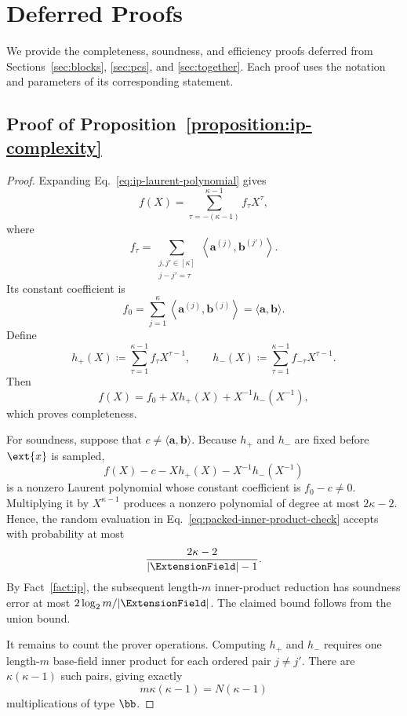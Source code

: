 \section{Deferred Proofs}
\label{appx:proof}
\label{appx:auxiliary-proofs}

We provide the completeness, soundness, and efficiency proofs
deferred from Sections~\ref{sec:blocks}, \ref{sec:pcs}, and
\ref{sec:together}. Each proof uses the notation and parameters
of its corresponding statement.

\subsection{Proof of Proposition~\ref{proposition:ip-complexity}}
\label{appx:proof-ip}

\begin{proof}
Expanding Eq.~\eqref{eq:ip-laurent-polynomial} gives
\[
    f(X)
    =
    \sum_{\tau=-(\kappa-1)}^{\kappa-1}
    f_\tau X^\tau,
\]
where
\[
    f_\tau
    =
    \sum_{\substack{j,j'\in[\kappa]\\j-j'=\tau}}
    \left\langle
        \bm a^{(j)},\bm b^{(j')}
    \right\rangle.
\]
Its constant coefficient is
\[
    f_0
    =
    \sum_{j=1}^{\kappa}
    \left\langle
        \bm a^{(j)},\bm b^{(j)}
    \right\rangle
    =
    \langle\bm a,\bm b\rangle.
\]
Define
\[
    h_+(X)
    \coloneqq
    \sum_{\tau=1}^{\kappa-1}
    f_\tau X^{\tau-1},
    \qquad
    h_-(X)
    \coloneqq
    \sum_{\tau=1}^{\kappa-1}
    f_{-\tau}X^{\tau-1}.
\]
Then
\[
    f(X)
    =
    f_0
    +Xh_+(X)
    +X^{-1}h_-(X^{-1}),
\]
which proves completeness.

For soundness, suppose that
\(c\neq\langle\bm a,\bm b\rangle\). Because \(h_+\) and \(h_-\)
are fixed before \(\ext{x}\) is sampled,
\[
    f(X)-c-Xh_+(X)-X^{-1}h_-(X^{-1})
\]
is a nonzero Laurent polynomial whose constant coefficient is
\(f_0-c\neq0\). Multiplying it by \(X^{\kappa-1}\) produces a
nonzero polynomial of degree at most \(2\kappa-2\). Hence, the
random evaluation in Eq.~\eqref{eq:packed-inner-product-check}
accepts with probability at most
\[
    \frac{2\kappa-2}{|\ExtensionField|-1}.
\]
By Fact~\ref{fact:ip}, the subsequent length-\(m\)
inner-product reduction has soundness error at most
\(2\log_2m/|\ExtensionField|\). The claimed bound follows from
the union bound.

It remains to count the prover operations. Computing \(h_+\) and
\(h_-\) requires one length-\(m\) base-field inner product for
each ordered pair \(j\neq j'\). There are
\(\kappa(\kappa-1)\) such pairs, giving exactly
\[
    m\kappa(\kappa-1)
    =
    N(\kappa-1)
\]
multiplications of type \(\bb\).


\end{proof}
